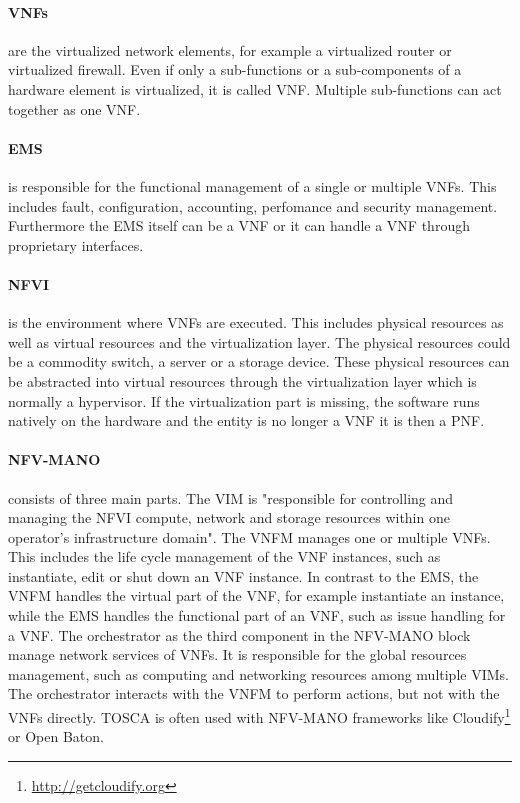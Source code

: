 \paragraph{\acp{VNF}} are the virtualized network elements, for example a virtualized router or virtualized firewall.
Even if only a sub-functions or a sub-components of a hardware element is virtualized, it is called \ac{VNF}.\autocite[cf.]{Kahn:2015}
Multiple sub-functions can act together as one \ac{VNF}.

\paragraph{\ac{EMS}} is responsible for the functional management of a single or multiple \acp{VNF}.\autocite[cf.]{Kahn:2015}
This includes fault, configuration, accounting, perfomance and security management.\autocite[cf.]{Kahn:2015}
Furthermore the \ac{EMS} itself can be a \ac{VNF} or it can handle a \ac{VNF} through proprietary interfaces.\autocite[cf.]{Kahn:2015}

\paragraph{\ac{NFVI}} is the environment where \acp{VNF} are executed.
This includes physical resources as well as virtual resources and the virtualization layer.
The physical resources could be a commodity switch, a server or a storage device.
These physical resources can be abstracted into virtual resources through the virtualization layer which is normally a hypervisor.
If the virtualization part is missing, the software runs natively on the hardware and the entity is no longer a \ac{VNF} it is then a \ac{PNF}.\autocite[cf.]{Kahn:2015}

\paragraph{\ac{NFV-MANO}} consists of three main parts.
The \ac{VIM} is "responsible for controlling and managing the NFVI compute, network and storage resources within one operator’s infrastructure domain"\autocite{Kahn:2015}.
The \ac{VNFM} manages one or multiple \acp{VNF}.
This includes the life cycle management of the \ac{VNF} instances, such as instantiate, edit or shut down an \ac{VNF} instance.\autocite[cf.]{Tosca:NFV}
In contrast to the \ac{EMS}, the \ac{VNFM} handles the virtual part of the \ac{VNF}, for example instantiate an instance, while the \ac{EMS} handles the functional part of an \ac{VNF}, such as issue handling for a \ac{VNF}.
The orchestrator as the third component in the \ac{NFV-MANO} block manage network services of \acp{VNF}.
It is responsible for the global resources management, such as computing and networking resources among multiple \acp{VIM}.\autocite[cf.]{Kahn:2015}
The orchestrator interacts with the \ac{VNFM} to perform actions, but not with the \acp{VNF} directly.\autocite[cf.]{Kahn:2015}
\ac{TOSCA} is often used with \ac{NFV-MANO} frameworks like Cloudify\footnote{\url{http://getcloudify.org}} or Open Baton.\autocite[cf.]{Tosca:NFV}

